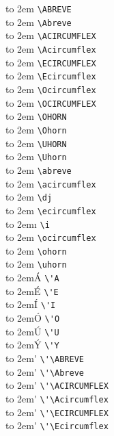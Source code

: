 
\large
\def\X#1{\hbox to 2em{\hss#1\hss}}
\begin{multicols}{2}
\noindent
\X{\ABREVE} \verb|\ABREVE| \\
\X{\Abreve} \verb|\Abreve| \\
\X{\ACIRCUMFLEX} \verb|\ACIRCUMFLEX| \\
\X{\Acircumflex} \verb|\Acircumflex| \\
\X{\ECIRCUMFLEX} \verb|\ECIRCUMFLEX| \\
\X{\Ecircumflex} \verb|\Ecircumflex| \\
\X{\Ocircumflex} \verb|\Ocircumflex| \\
\X{\OCIRCUMFLEX} \verb|\OCIRCUMFLEX| \\
\X{\OHORN} \verb|\OHORN| \\
\X{\Ohorn} \verb|\Ohorn| \\
\X{\UHORN} \verb|\UHORN| \\
\X{\Uhorn} \verb|\Uhorn| \\
\X{\abreve} \verb|\abreve| \\
\X{\acircumflex} \verb|\acircumflex| \\
\X{\dj} \verb|\dj| \\
\X{\ecircumflex} \verb|\ecircumflex| \\
\X{\i} \verb|\i| \\
\X{\ocircumflex} \verb|\ocircumflex| \\
\X{\ohorn} \verb|\ohorn| \\
\X{\uhorn} \verb|\uhorn| \\
\X{\'A} \verb|\'A| \\
\X{\'E} \verb|\'E| \\
\X{\'I} \verb|\'I| \\
\X{\'O} \verb|\'O| \\
\X{\'U} \verb|\'U| \\
\X{\'Y} \verb|\'Y| \\
\X{\'\ABREVE} \verb|\'\ABREVE| \\
\X{\'\Abreve} \verb|\'\Abreve| \\
\X{\'\ACIRCUMFLEX} \verb|\'\ACIRCUMFLEX| \\
\X{\'\Acircumflex} \verb|\'\Acircumflex| \\
\X{\'\ECIRCUMFLEX} \verb|\'\ECIRCUMFLEX| \\
\X{\'\Ecircumflex} \verb|\'\Ecircumflex| \\

\end{multicols}
